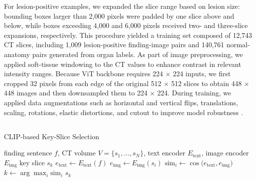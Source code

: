 \documentclass[bioengineering,article,submit,pdftex,moreauthors]{Definitions/mdpi}
\begin{document}
For lesion-positive examples, we expanded the slice range based on lesion size: bounding boxes larger than 2,000 pixels were padded by one slice above and below, while boxes exceeding 4,000 and 6,000 pixels received two- and three-slice expansions, respectively. 
This procedure yielded a training set composed of 12,743 CT slices, including 1,009 lesion-positive finding-image pairs and 140,761 normal-anatomy pairs generated from organ labels.
As part of image preprocessing, we applied soft-tissue windowing to the CT values to enhance contrast in relevant intensity ranges. 
Because ViT backbone requires 224 × 224 inputs, we first cropped 32 pixels from each edge of the original 512 × 512 slices to obtain 448 × 448 images and then downsampled them to 224 × 224. 
During training, we applied data augmentations such as horizontal and vertical flips, translations, scaling, rotations, elastic distortions, and cutout to improve model robustness \cite{devries_improved_2017}.


\subsection{}  


\begin{algorithm}
  \caption{CLIP-based Key-Slice Selection}
  \label{alg:key_slice_selection}
  \begin{algorithmic}[1]
    \REQUIRE finding sentence $f$, CT volume $V = \{s_1, \dots, s_N\}$, text encoder $E_{\mathrm{text}}$, image encoder $E_{\mathrm{img}}$
    \ENSURE key slice $s_k$
    \STATE $e_{\mathrm{text}} \leftarrow E_{\mathrm{text}}(f)$ 
      \STATE $e_{\mathrm{img}} \leftarrow E_{\mathrm{img}}(s_i)$ 
      \STATE $\mathrm{sim}_i \leftarrow \cos\bigl(e_{\mathrm{text}}, e_{\mathrm{img}}\bigr)$ 
    \ENDFOR
    \STATE $k \leftarrow \arg\max_i \mathrm{sim}_i$ 
    \RETURN $s_k$
  \end{algorithmic}
\end{algorithm}
\end{document}
